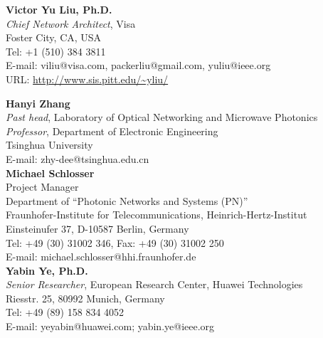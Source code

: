 \documentclass[letterpaper,11pt]{article}
\begin{document}
\vspace{0.2in}%
\textbf{Victor Yu Liu, Ph.D.}\\
\textit{Chief Network Architect}, Visa\\
Foster City, CA, USA\\
Tel: +1 (510) 384 3811\\
E-mail: viliu@visa.com, packerliu@gmail.com, yuliu@ieee.org\\
URL: \url{http://www.sis.pitt.edu/~yliu/}


\vspace{0.2in}%
\textbf{Hanyi Zhang}\\
\textit{Past head}, Laboratory of Optical Networking and Microwave
Photonics\\
\textit{Professor}, Department of Electronic Engineering\\
Tsinghua University\\
E-mail: zhy-dee@tsinghua.edu.cn\\


\vspace{0.2in}%
\textbf{Michael Schlosser}\\
Project Manager\\
Department of ``Photonic Networks and Systems (PN)''\\
Fraunhofer-Institute for Telecommunications, Heinrich-Hertz-Institut\\
Einsteinufer 37, D-10587 Berlin, Germany\\
Tel: +49 (30) 31002 346, Fax: +49 (30) 31002 250\\
E-mail: michael.schlosser@hhi.fraunhofer.de\\ %


\vspace{0.2in}%
\textbf{Yabin Ye, Ph.D.}\\
\textit{Senior Researcher}, European Research Center, Huawei Technologies\\
Riesstr. 25, 80992 Munich, Germany\\
Tel: +49 (89) 158 834 4052\\
E-mail: yeyabin@huawei.com; yabin.ye@ieee.org\\
\end{document}

